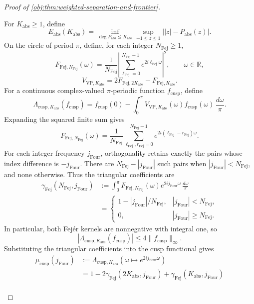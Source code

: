\begin{proof}[Proof of \cref{obj:thm:weighted-separation-and-frontier}]
\begin{enumerate}
For \(K_{\mathrm{abs}}\ge1\), define
\[
E_{\mathrm{abs}}(K_{\mathrm{abs}})
=\inf_{\deg P_{\mathrm{abs}}\le K_{\mathrm{abs}}}
\sup_{-1\le z\le1}\bigl||z|-P_{\mathrm{abs}}(z)\bigr|.
\]
On the circle of period \(\pi\), define, for each integer \(N_{\mathrm{Fej}}\ge1\),
\[
F_{\mathrm{Fej},N_{\mathrm{Fej}}}(\omega)
=\frac1{N_{\mathrm{Fej}}}
\left|\sum_{\ell_{\mathrm{Fej}}=0}^{N_{\mathrm{Fej}}-1}
 e^{2i\ell_{\mathrm{Fej}}\omega}\right|^2,
\qquad \omega\in\mathbb R,
\]
\[
V_{\mathrm{VP},K_{\mathrm{abs}}}
=2F_{\mathrm{Fej},2K_{\mathrm{abs}}}
-F_{\mathrm{Fej},K_{\mathrm{abs}}}.
\]
For a continuous complex-valued \(\pi\)-periodic function \(f_{\mathrm{cusp}}\), define
\[
\Lambda_{\mathrm{cusp},K_{\mathrm{abs}}}(f_{\mathrm{cusp}})
=f_{\mathrm{cusp}}(0)-\int_0^\pi
V_{\mathrm{VP},K_{\mathrm{abs}}}(\omega)
 f_{\mathrm{cusp}}(\omega)\,\frac{d\omega}{\pi}.
\]
Expanding the squared finite sum gives
\[
F_{\mathrm{Fej},N_{\mathrm{Fej}}}(\omega)
=\frac1{N_{\mathrm{Fej}}}
\sum_{\ell_{\mathrm{Fej}},r_{\mathrm{Fej}}=0}^{N_{\mathrm{Fej}}-1}
 e^{2i(\ell_{\mathrm{Fej}}-r_{\mathrm{Fej}})\omega}.
\]
For each integer frequency \(j_{\mathrm{Four}}\), orthogonality retains exactly the pairs whose index difference is \(-j_{\mathrm{Four}}\). There are
\(N_{\mathrm{Fej}}-|j_{\mathrm{Four}}|\) such pairs when
\(|j_{\mathrm{Four}}|<N_{\mathrm{Fej}}\), and none otherwise. Thus the triangular coefficients are
\[
\begin{aligned}
\gamma_{\mathrm{Fej}}(N_{\mathrm{Fej}},j_{\mathrm{Four}})
&:=\int_0^\pi F_{\mathrm{Fej},N_{\mathrm{Fej}}}(\omega)
 e^{2ij_{\mathrm{Four}}\omega}\,\frac{d\omega}{\pi}\\
&=\begin{cases}
1-|j_{\mathrm{Four}}|/N_{\mathrm{Fej}},
&|j_{\mathrm{Four}}|<N_{\mathrm{Fej}},\\
0,&|j_{\mathrm{Four}}|\ge N_{\mathrm{Fej}}.
\end{cases}
\end{aligned}
\]
In particular, both Fej\'er kernels are nonnegative with integral one, so
\[
|\Lambda_{\mathrm{cusp},K_{\mathrm{abs}}}(f_{\mathrm{cusp}})|
\le4\|f_{\mathrm{cusp}}\|_\infty.
\]
Substituting the triangular coefficients into the cusp functional gives
\[
\begin{aligned}
\mu_{\mathrm{cusp}}(j_{\mathrm{Four}})
&:=\Lambda_{\mathrm{cusp},K_{\mathrm{abs}}}
 (\omega\mapsto e^{2ij_{\mathrm{Four}}\omega})\\
&=1-2\gamma_{\mathrm{Fej}}(2K_{\mathrm{abs}},j_{\mathrm{Four}})
 +\gamma_{\mathrm{Fej}}(K_{\mathrm{abs}},j_{\mathrm{Four}})\\

\end{aligned}\]
\end{enumerate}
\end{proof}
